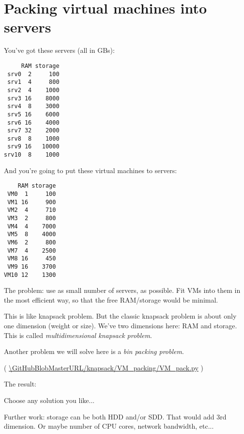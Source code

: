 \section{Packing virtual machines into servers}

\renewcommand{\CURPATH}{knapsack/VM_packing}

You've got these servers (all in GBs):

\begin{lstlisting}
     RAM storage
 srv0  2     100
 srv1  4     800
 srv2  4    1000
 srv3 16    8000
 srv4  8    3000
 srv5 16    6000
 srv6 16    4000
 srv7 32    2000
 srv8  8    1000
 srv9 16   10000
srv10  8    1000
\end{lstlisting}

And you're going to put these virtual machines to servers:

\begin{lstlisting}
    RAM storage
 VM0  1     100
 VM1 16     900
 VM2  4     710
 VM3  2     800
 VM4  4    7000
 VM5  8    4000
 VM6  2     800
 VM7  4    2500
 VM8 16     450
 VM9 16    3700
VM10 12    1300
\end{lstlisting}

The problem: use as small number of servers, as possible.
Fit VMs into them in the most efficient way, so that the free RAM/storage would be minimal.

This is like knapsack problem.
But the classic knapsack problem is about only one dimension (weight or size).
We've two dimensions here: RAM and storage.
This is called \emph{multidimensional knapsack problem}.

Another problem we will solve here is a \emph{bin packing problem}.



( \url{\GitHubBlobMasterURL/\CURPATH/VM_pack.py} )

The result:



Choose any solution you like...

Further work: storage can be both HDD and/or SDD. That would add 3rd dimension. Or maybe number of CPU cores, network bandwidth, etc...

